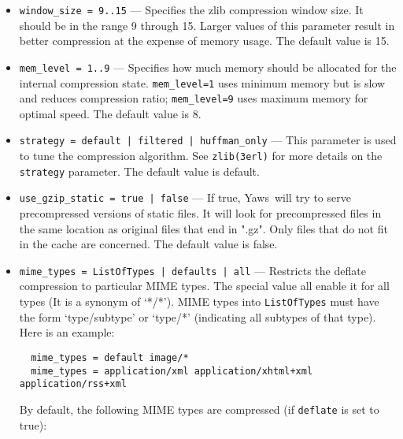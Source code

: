 \documentclass[11pt,oneside,english]{book}
\newcommand{\Yaws}            %
        {{\sc Yaws}}
\begin{document}
\begin{itemize}
\begin{itemize}
             \item \verb+window_size = 9..15+ --- Specifies the zlib compression
               window size. It should be in the range 9 through 15. Larger
               values of this parameter result in better compression at the
               expense of memory usage. The default value is 15.

             \item \verb+mem_level = 1..9+ --- Specifies how much memory should
               be allocated for the internal compression
               state. \verb+mem_level=1+ uses minimum memory but is slow and
               reduces compression ratio; \verb+mem_level=9+ uses maximum memory
               for optimal speed. The default value is 8.

             \item \verb+strategy = default | filtered | huffman_only+ --- This
               parameter is used to tune the compression algorithm. See
               \verb+zlib(3erl)+ for more details on the \verb+strategy+
               parameter. The default value is default.

             \item \verb+use_gzip_static = true | false+ --- If true,
               \Yaws\ will try to serve precompressed versions of static
               files. It will look for precompressed files in the same location
               as original files that end in ".gz". Only files that do not fit
               in the cache are concerned. The default value is false.

             \item \verb+mime_types = ListOfTypes | defaults | all+ ---
               Restricts the deflate compression to particular MIME types. The
               special value all enable it for all types (It is a synonym of
               `*/*'). MIME types into \verb+ListOfTypes+ must have the form
               `type/subtype' or `type/*' (indicating all subtypes of that
               type). Here is an example:
\begin{verbatim}
  mime_types = default image/*
  mime_types = application/xml application/xhtml+xml application/rss+xml
\end{verbatim}
                    By default, the following MIME types are compressed (if
                    \verb+deflate+ is set to true):


\end{itemize}
\end{itemize}
\end{document}
